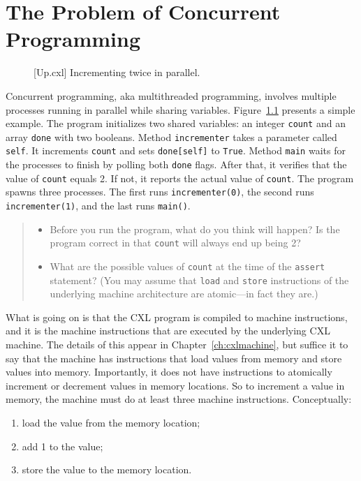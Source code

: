 \documentclass{report}
\newenvironment{code}{
\tcolorbox
}{
\endtcolorbox
}
\begin{document}
\chapter{The Problem of Concurrent Programming}
\label{ch:concurrent}

\begin{figure}
\begin{code}
\end{code}
\caption{[Up.cxl] Incrementing twice in parallel.}
\label{fig:inc}
\end{figure}

Concurrent programming, aka multithreaded programming, involves multiple
processes
running in parallel while sharing variables.
Figure~\ref{fig:inc} presents a simple example.
The program
initializes two shared variables: an integer \texttt{count} and
an array \texttt{done} with two booleans.
Method \texttt{incrementer} takes a parameter called \texttt{self}.
It increments \texttt{count} and sets \texttt{done[self]} to \texttt{True}.
Method \texttt{main} waits for the processes to finish by polling
both \texttt{done} flags.
After that, it verifies that the value of \texttt{count} equals 2.  If not,
it reports the actual value of \texttt{count}.
The program spawns three processes.
The first runs \texttt{incrementer(0)}, the second runs
\texttt{incrementer(1)}, and the last runs \texttt{main()}.

\begin{quote}
\begin{itemize}
\item Before you run the program, what do you think will happen?  Is the
program correct in that \texttt{count} will always end up being 2?
\item What are the possible values of \texttt{count} at the time of the
\texttt{assert} statement?
(You may assume that \texttt{load} and \texttt{store} instructions of the
underlying machine architecture are atomic---in fact they are.)
\end{itemize}
\end{quote}

What is going on is that the CXL program is compiled to machine instructions,
and it is the machine instructions that are executed by the underlying CXL
machine.  The details of this appear in Chapter~\ref{ch:cxlmachine},
but suffice it to
say that the machine has instructions that load values from memory and store
values into memory.  Importantly, it does not have instructions to atomically
increment or decrement values in memory locations.
So to increment a value in memory,
the machine must do at least three machine instructions.  Conceptually:
\begin{enumerate}
\item load the value from the memory location;
\item add 1 to the value;
\item store the value to the memory location.
\end{enumerate}
\end{document}
